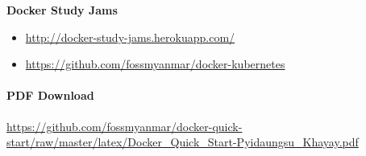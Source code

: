 \documentclass{article}
\begin{document}
\textbf{Docker Study Jams}

\begin{itemize}
\itemsep1pt\parskip0pt
\item
  \url{http://docker-study-jams.herokuapp.com/}
\item
  \url{https://github.com/fossmyanmar/docker-kubernetes}
\end{itemize}

\paragraph{PDF Download}\label{pdf-download}

\url{https://github.com/fossmyanmar/docker-quick-start/raw/master/latex/Docker_Quick_Start-Pyidaungsu_Khayay.pdf}
\end{document}
